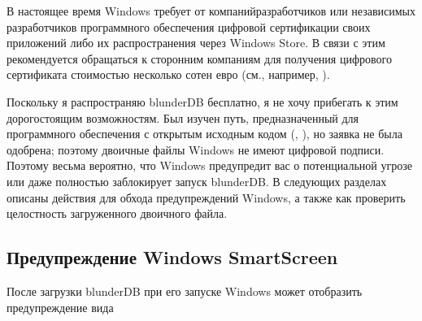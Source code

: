 \documentclass[letterpaper,10pt,russian]{sphinxmanual}
\begin{document}
\sphinxAtStartPar
В настоящее время Windows требует от компаний\sphinxhyphen{}разработчиков или независимых разработчиков программного обеспечения цифровой сертификации своих приложений либо их распространения через Windows Store. В связи с этим рекомендуется обращаться к сторонним компаниям для получения цифрового сертификата стоимостью несколько сотен евро (см., например, ).

\sphinxAtStartPar
Поскольку я распространяю blunderDB бесплатно, я не хочу прибегать к этим дорогостоящим возможностям. Был изучен  путь, предназначенный для программного обеспечения с открытым исходным кодом (, ), но заявка не была одобрена; поэтому двоичные файлы Windows не имеют цифровой подписи. Поэтому весьма вероятно, что Windows предупредит вас о потенциальной угрозе или даже полностью заблокирует запуск blunderDB. В следующих разделах описаны действия для обхода предупреждений Windows, а также как проверить целостность загруженного двоичного файла.


\subsection{Предупреждение Windows SmartScreen}
\label{\detokenize{annexe_windows_securite:avertissement-windows-smartscreen}}
\sphinxAtStartPar
После загрузки blunderDB при его запуске Windows может отобразить предупреждение вида

\begin{figure}[htbp]
\centering

\noindent{}
\end{figure}
\end{document}
